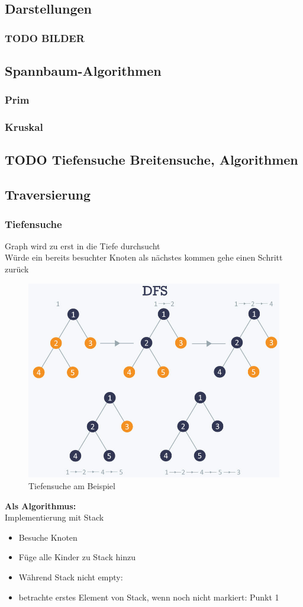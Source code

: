 \documentclass{article}
\begin{document}
	\subsection{Darstellungen}
	\subsubsection{TODO BILDER} %
	\subsection{Spannbaum-Algorithmen}
	\subsubsection{Prim}
	\subsubsection{Kruskal}
	\subsection{TODO Tiefensuche Breitensuche, Algorithmen}
	\subsection{Traversierung}
	\subsubsection{Tiefensuche}
	Graph wird zu erst in die Tiefe durchsucht
	\\Würde ein bereits besuchter Knoten als nächstes kommen gehe einen Schritt zurück
	\begin{figure}[H]
		\centering
		\includegraphics[width=0.7\linewidth]{Abbildungen/tiefensuche}
		\caption{Tiefensuche am Beispiel}
		\label{fig:tiefensuche}
	\end{figure}
	\textbf{Als Algorithmus:}
	\\Implementierung mit Stack
	\begin{itemize}
	\item Besuche Knoten
	\item Füge alle Kinder zu Stack hinzu
	\item Während Stack nicht empty:
	\item betrachte erstes Element von Stack, wenn noch nicht markiert: Punkt 1
	\end{itemize}
\end{document}
